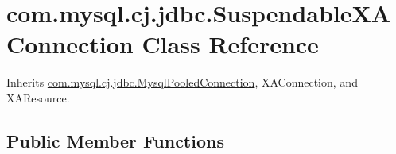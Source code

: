 \hypertarget{classcom_1_1mysql_1_1cj_1_1jdbc_1_1_suspendable_x_a_connection}{}\section{com.\+mysql.\+cj.\+jdbc.\+Suspendable\+X\+A\+Connection Class Reference}
\label{classcom_1_1mysql_1_1cj_1_1jdbc_1_1_suspendable_x_a_connection}


Inherits \mbox{\hyperlink{classcom_1_1mysql_1_1cj_1_1jdbc_1_1_mysql_pooled_connection}{com.\+mysql.\+cj.\+jdbc.\+Mysql\+Pooled\+Connection}}, X\+A\+Connection, and X\+A\+Resource.

\subsection*{Public Member Functions}
